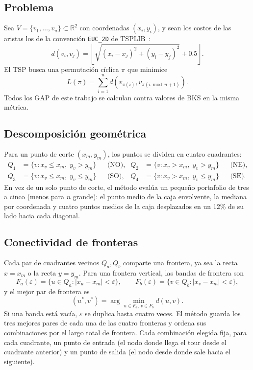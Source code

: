 \documentclass[runningheads]{llncs}
\begin{document}
\subsection{Problema}

Sea $V=\{v_1,\dots,v_n\}\subset\mathbb{R}^2$ con coordenadas
$(x_i,y_i)$, y sean los costos de las aristas los de la convención
\texttt{EUC\_2D} de TSPLIB~\cite{reinelt1991tsplib}:
\begin{equation}
 d(v_i,v_j)=\left\lfloor\sqrt{(x_i-x_j)^2+(y_i-y_j)^2}+0.5\right\rfloor.
 \label{eq:dist}
\end{equation}
El TSP busca una permutación cíclica $\pi$ que minimice
\begin{equation}
 L(\pi)=\sum_{i=1}^{n} d\!\left(v_{\pi(i)},v_{\pi(i\bmod n+1)}\right).
 \label{eq:tsp}
\end{equation}
Todos los GAP de este trabajo se calculan contra valores de BKS en la
misma métrica.

\subsection{Descomposición geométrica}

Para un punto de corte $(x_m,y_m)$, los puntos se dividen en cuatro
cuadrantes:
\begin{align}
Q_1&=\{v: x_v\le x_m,\; y_v>y_m\}  &&\text{(NO)}, &
Q_2&=\{v: x_v>x_m,\; y_v>y_m\}    &&\text{(NE)},\\
Q_3&=\{v: x_v\le x_m,\; y_v\le y_m\}&&\text{(SO)}, &
Q_4&=\{v: x_v>x_m,\; y_v\le y_m\} &&\text{(SE)}.
\end{align}
En vez de un solo punto de corte, el método evalúa un pequeño portafolio
de tres a cinco (menos para $n$ grande): el punto medio de la caja
envolvente, la mediana por coordenada y cuatro puntos medios de la caja
desplazados en un 12\% de su lado hacia cada diagonal.

\subsection{Conectividad de fronteras}

Cada par de cuadrantes vecinos $Q_a,Q_b$ comparte una frontera, ya sea la
recta $x=x_m$ o la recta $y=y_m$. Para una frontera vertical, las bandas
de frontera son
\begin{equation}
F_a(\varepsilon)=\{u\in Q_a:|x_u-x_m|<\varepsilon\}, \qquad
F_b(\varepsilon)=\{v\in Q_b:|x_v-x_m|<\varepsilon\},
\end{equation}
y el mejor par de frontera es
\begin{equation}
(u^*,v^*)=\arg\min_{u\in F_a,\,v\in F_b} d(u,v).
\label{eq:frontier}
\end{equation}
Si una banda está vacía, $\varepsilon$ se duplica hasta cuatro veces. El
método guarda los tres mejores pares de cada una de las cuatro fronteras
y ordena sus combinaciones por el largo total de frontera. Cada
combinación elegida fija, para cada cuadrante, un punto de entrada (el
nodo donde llega el tour desde el cuadrante anterior) y un punto de
salida (el nodo desde donde sale hacia el siguiente).
\end{document}

